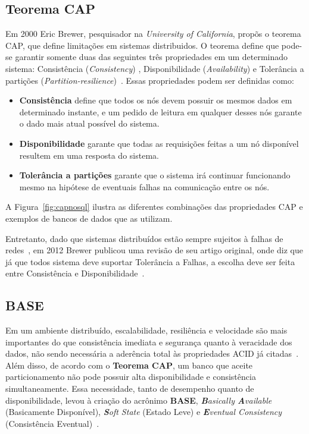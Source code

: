 \subsection{Teorema CAP}
\label{sec:cap}
Em 2000 Eric Brewer, pesquisador na \emph{University of California}, propõs o teorema CAP, que define limitações em sistemas distribuidos. O teorema define que pode-se garantir somente duas das seguintes três propriedades em um determinado sistema: Consistência (\emph{Consistency}) , Disponibilidade (\emph{Availability}) e Tolerância a partições (\emph{Partition-resilience})~\cite{brewer}. Essas propriedades podem ser definidas como:
\begin{itemize}
	\item \textbf{Consistência} define que todos os nós devem possuir os mesmos dados em determinado instante, e um pedido de leitura em qualquer desses nós garante o dado mais atual possível do sistema.
	\item \textbf{Disponibilidade} garante que todas as requisições feitas a um nó disponível resultem em uma resposta do sistema.
	\item \textbf{Tolerância a partições} garante que o sistema irá continuar funcionando mesmo na hipótese de eventuais falhas na comunicação entre os nós.
\end{itemize}

A Figura~\ref{fig:capnosql} ilustra as diferentes combinações das propriedades CAP e exemplos de bancos de dados que as utilizam.

Entretanto, dado que sistemas distribuídos estão sempre sujeitos à falhas de redes~\cite{deutsch}, em 2012 Brewer publicou uma revisão de seu artigo original, onde diz que já que todos sistema deve suportar Tolerância a Falhas, a escolha deve ser feita entre Consistência e Disponibilidade~\cite{brewer12years}.



\subsection{BASE}
Em um ambiente distribuído, escalabilidade, resiliência e velocidade são mais importantes do que consistência imediata e segurança quanto à veracidade dos  dados, não sendo necessária a aderência total às propriedades ACID já citadas~\cite{neo4j_acidbase}. Além disso, de acordo com o \textbf{Teorema CAP}, um banco que aceite particionamento não pode possuir alta disponibilidade e consistência simultaneamente. Essa necessidade, tanto de desempenho quanto de disponibilidade, levou à criação do acrônimo \textbf{BASE}, \emph{\textbf{B}asically \textbf{A}vailable} (Basicamente Disponível), \emph{\textbf{S}oft State} (Estado Leve) e \emph{\textbf{E}ventual Consistency} (Consistência Eventual)~\cite{foxcluster}. 

